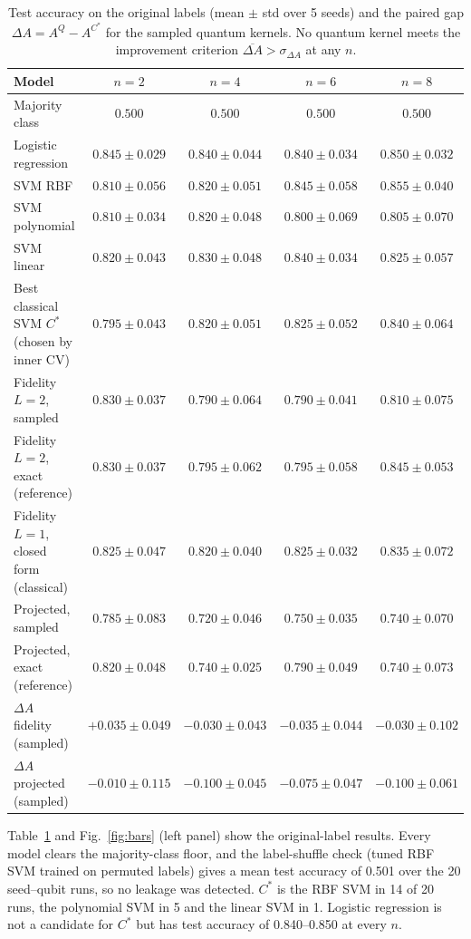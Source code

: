 \documentclass[conference]{IEEEtran}
\begin{document}
\begin{table}[t]
\centering
\caption{Test accuracy on the original labels (mean $\pm$ std over 5 seeds) and the paired gap $\Delta A=A^Q-A^{C^\ast}$ for the sampled quantum kernels. No quantum kernel meets the improvement criterion $\overline{\Delta A}>\sigma_{\Delta A}$ at any $n$.}
\label{tab:orig}
\footnotesize
\begin{tabular}{@{}lcccc@{}}
\toprule
Model & $n=2$ & $n=4$ & $n=6$ & $n=8$ \\
\midrule
Majority class & $0.500$ & $0.500$ & $0.500$ & $0.500$ \\
Logistic regression & $0.845\pm0.029$ & $0.840\pm0.044$ & $0.840\pm0.034$ & $0.850\pm0.032$ \\
SVM RBF & $0.810\pm0.056$ & $0.820\pm0.051$ & $0.845\pm0.058$ & $0.855\pm0.040$ \\
SVM polynomial & $0.810\pm0.034$ & $0.820\pm0.048$ & $0.800\pm0.069$ & $0.805\pm0.070$ \\
SVM linear & $0.820\pm0.043$ & $0.830\pm0.048$ & $0.840\pm0.034$ & $0.825\pm0.057$ \\
Best classical SVM $C^\ast$ (chosen by inner CV) & $0.795\pm0.043$ & $0.820\pm0.051$ & $0.825\pm0.052$ & $0.840\pm0.064$ \\
\midrule
Fidelity $L=2$, sampled & $0.830\pm0.037$ & $0.790\pm0.064$ & $0.790\pm0.041$ & $0.810\pm0.075$ \\
Fidelity $L=2$, exact (reference) & $0.830\pm0.037$ & $0.795\pm0.062$ & $0.795\pm0.058$ & $0.845\pm0.053$ \\
Fidelity $L=1$, closed form (classical) & $0.825\pm0.047$ & $0.820\pm0.040$ & $0.825\pm0.032$ & $0.835\pm0.072$ \\
Projected, sampled & $0.785\pm0.083$ & $0.720\pm0.046$ & $0.750\pm0.035$ & $0.740\pm0.070$ \\
Projected, exact (reference) & $0.820\pm0.048$ & $0.740\pm0.025$ & $0.790\pm0.049$ & $0.740\pm0.073$ \\
\midrule
$\Delta A$ fidelity (sampled) & $+0.035\pm0.049$ & $-0.030\pm0.043$ & $-0.035\pm0.044$ & $-0.030\pm0.102$ \\
$\Delta A$ projected (sampled) & $-0.010\pm0.115$ & $-0.100\pm0.045$ & $-0.075\pm0.047$ & $-0.100\pm0.061$ \\
\bottomrule
\end{tabular}
\end{table}

Table~\ref{tab:orig} and Fig.~\ref{fig:bars} (left panel) show the original-label results. Every model clears the majority-class floor, and the label-shuffle check (tuned RBF SVM trained on permuted labels) gives a mean test accuracy of 0.501 over the 20 seed--qubit runs, so no leakage was detected. $C^\ast$ is the RBF SVM in 14 of 20 runs, the polynomial SVM in 5 and the linear SVM in 1. Logistic regression is not a candidate for $C^\ast$ but has test accuracy of 0.840--0.850 at every $n$.
\end{document}
